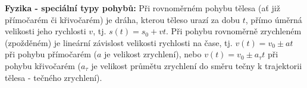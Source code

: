 \begin{mdframed}[style=mdexam]
  \begin{example}\label{mai:exam036}
    \textbf{Fyzika - speciální typy pohybů:}\newline
    Při rovnoměrném pohybu tělesa (ať již přímočarém či křivočarém) je dráha, kterou těleso urazí za
    dobu \(t\), přímo úměrná velikosti jeho rychlosti \(v\), tj. \(s(t) = s_0 + vt\). Při pohybu
    rovnoměrně zrychleném (zpožděném) je lineární závislost velikosti rychlosti na čase, tj. \(v(t)
    = v_0 \pm at\) při pohybu přímočarém (\(a\) je velikost zrychlení), nebo \(v(t) = v_0 \pm a_\tau
    t\) při pohybu křivočarém (\(a_\tau\) je velikost průmětu zrychlení do směru tečny k trajektorii
    tělesa - tečného zrychlení).
  \end{example}
\end{mdframed}